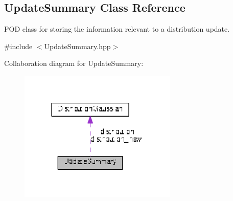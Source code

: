\hypertarget{classDmpBbo_1_1UpdateSummary}{\subsection{Update\+Summary Class Reference}
\label{classDmpBbo_1_1UpdateSummary}
}


P\+O\+D class for storing the information relevant to a distribution update.  




{\ttfamily \#include $<$Update\+Summary.\+hpp$>$}



Collaboration diagram for Update\+Summary\+:
\nopagebreak
\begin{figure}[H]
\begin{center}
\leavevmode
\includegraphics[width=213pt]{classDmpBbo_1_1UpdateSummary__coll__graph}
\end{center}
\end{figure}
